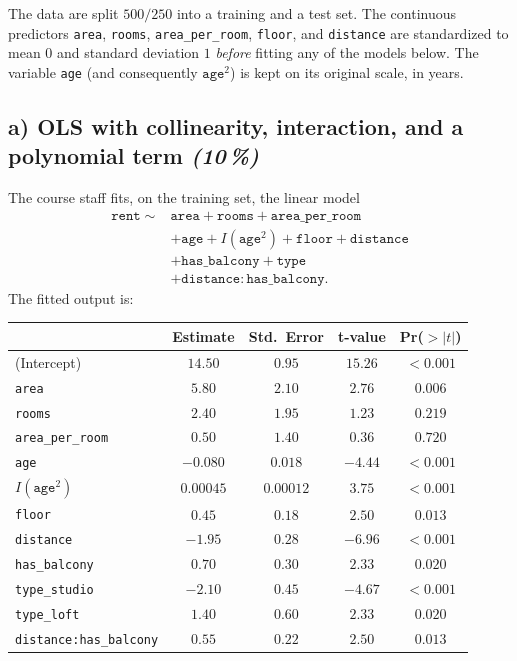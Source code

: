 \documentclass[11pt,a4paper]{article}
\newcommand{\subpoints}[1]{\textit{(#1\,\%)}}
\begin{document}
The data are split $500 / 250$ into a training and a test set. The continuous predictors \texttt{area}, \texttt{rooms}, \texttt{area\_per\_room}, \texttt{floor}, and \texttt{distance} are standardized to mean $0$ and standard deviation $1$ \emph{before} fitting any of the models below. The variable \texttt{age} (and consequently $\texttt{age}^2$) is kept on its original scale, in years.

\subsection*{a) OLS with collinearity, interaction, and a polynomial term \subpoints{10}}

The course staff fits, on the training set, the linear model
\begin{align*}
\texttt{rent} \;\sim\; & \texttt{area} + \texttt{rooms} + \texttt{area\_per\_room} \\
 & + \texttt{age} + I(\texttt{age}^2) + \texttt{floor} + \texttt{distance} \\
 & + \texttt{has\_balcony} + \texttt{type} \\
 & + \texttt{distance}\!:\!\texttt{has\_balcony}.
\end{align*}
The fitted output is:

\begin{center}\small
\begin{tabular}{lcccc}
\toprule
 & \textbf{Estimate} & \textbf{Std.\ Error} & \textbf{t-value} & \textbf{Pr($>|t|$)} \\
\midrule
(Intercept)                       & $14.50$    & $0.95$    & $15.26$ & $<0.001$ \\
\texttt{area}                     & $5.80$     & $2.10$    & $2.76$  & $0.006$  \\
\texttt{rooms}                    & $2.40$     & $1.95$    & $1.23$  & $0.219$  \\
\texttt{area\_per\_room}          & $0.50$     & $1.40$    & $0.36$  & $0.720$  \\
\texttt{age}                      & $-0.080$   & $0.018$   & $-4.44$ & $<0.001$ \\
$I(\texttt{age}^2)$               & $0.00045$  & $0.00012$ & $3.75$  & $<0.001$ \\
\texttt{floor}                    & $0.45$     & $0.18$    & $2.50$  & $0.013$  \\
\texttt{distance}                 & $-1.95$    & $0.28$    & $-6.96$ & $<0.001$ \\
\texttt{has\_balcony}             & $0.70$     & $0.30$    & $2.33$  & $0.020$  \\
\texttt{type\_studio}             & $-2.10$    & $0.45$    & $-4.67$ & $<0.001$ \\
\texttt{type\_loft}               & $1.40$     & $0.60$    & $2.33$  & $0.020$  \\
\texttt{distance:has\_balcony}    & $0.55$     & $0.22$    & $2.50$  & $0.013$  \\
\bottomrule
\end{tabular}
\end{center}
\end{document}
